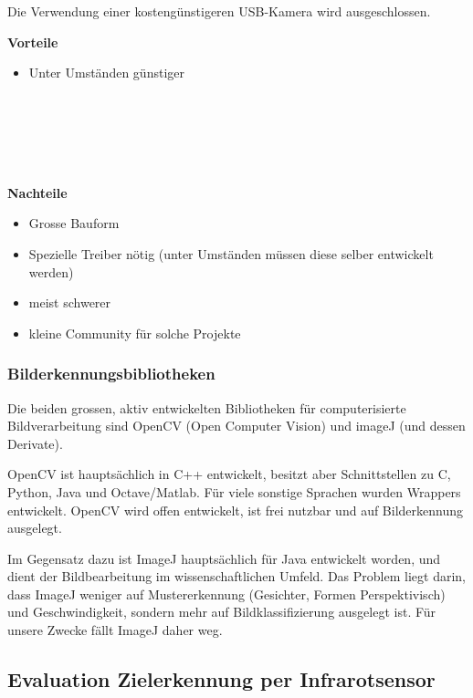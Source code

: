 \documentclass[a4paper]{report}
\begin{document}
\noindent
Die Verwendung einer kostengünstigeren USB-Kamera wird ausgeschlossen.

\begin{multicols}{2}
	\textbf{Vorteile}
	\begin{itemize}[label={+},noitemsep]
		\item Unter Umständen günstiger
		\\
		\\
		\\
		\\
		\\
		\\
	\end{itemize}
	\columnbreak
	\textbf{Nachteile}
	\begin{itemize}[label={-},noitemsep]
		\item Grosse Bauform
		\item Spezielle Treiber nötig (unter Umständen müssen diese selber entwickelt werden)
		\item meist schwerer
		\item kleine Community für solche Projekte
	\end{itemize}
\end{multicols}

\subsubsection{Bilderkennungsbibliotheken}
Die beiden grossen, aktiv entwickelten Bibliotheken für computerisierte Bildverarbeitung sind OpenCV (Open Computer Vision) und imageJ (und dessen Derivate).

OpenCV ist hauptsächlich in C++ entwickelt, besitzt aber Schnittstellen zu C, Python, Java und Octave/Matlab. Für viele sonstige Sprachen wurden Wrappers entwickelt. OpenCV wird offen entwickelt, ist frei nutzbar und auf Bilderkennung ausgelegt.

Im Gegensatz dazu ist ImageJ hauptsächlich für Java entwickelt worden, und dient der Bildbearbeitung im wissenschaftlichen Umfeld. Das Problem liegt darin, dass ImageJ weniger auf Mustererkennung (Gesichter, Formen Perspektivisch) und Geschwindigkeit, sondern mehr auf Bildklassifizierung ausgelegt ist. Für unsere Zwecke fällt ImageJ daher weg.

\subsection{Evaluation Zielerkennung per Infrarotsensor}
\end{document}
